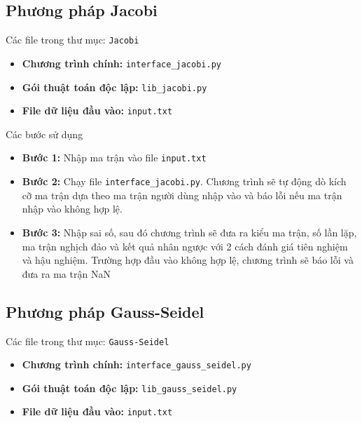 \documentclass[12pt,a4paper]{article}
\begin{document}
    \subsection{Phương pháp Jacobi}
    
    \par Các file trong thư mục: \texttt{Jacobi}
    \begin{itemize}
        \item \textbf{Chương trình chính:} \texttt{interface\_jacobi.py}
        \item \textbf{Gói thuật toán độc lập:} \texttt{lib\_jacobi.py}
        \item \textbf{File dữ liệu đầu vào:} \texttt{input.txt}
    \end{itemize}
    
    \par Các bước sử dụng
    \begin{itemize}
        \item \textbf{Bước 1:} Nhập ma trận vào file \texttt{input.txt}
        \item \textbf{Bước 2:} Chạy file \texttt{interface\_jacobi.py}. Chương trình sẽ tự động dò kích cỡ ma trận dựa theo ma trận người dùng nhập vào và báo lỗi nếu ma trận nhập vào không hợp lệ.
        \item \textbf{Bước 3:} Nhập sai số, sau đó chương trình sẽ đưa ra kiểu ma trận, số lần lặp, ma trận nghịch đảo và kết quả nhân ngược với 2 cách đánh giá tiên nghiệm và hậu nghiệm. Trường hợp đầu vào không hợp lệ, chương trình sẽ báo lỗi và đưa ra ma trận NaN
    \end{itemize}

    \subsection{Phương pháp Gauss-Seidel}
    
    \par Các file trong thư mục: \texttt{Gauss-Seidel}
    \begin{itemize}
        \item \textbf{Chương trình chính:} \texttt{interface\_gauss\_seidel.py}
        \item \textbf{Gói thuật toán độc lập:} \texttt{lib\_gauss\_seidel.py}
        \item \textbf{File dữ liệu đầu vào:} \texttt{input.txt}
    \end{itemize}
    
\end{document}
